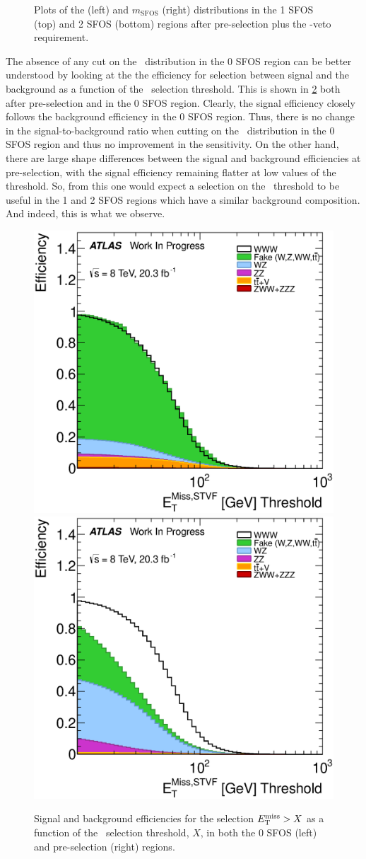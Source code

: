 \begin{figure}[ht!]
\caption{Plots of the \MET (left) and $m_{\textrm{SFOS}}$ (right) distributions 
in the 1 SFOS (top) and 2 SFOS (bottom) regions after pre-selection
plus the \bee-veto requirement.}
\label{fig:met_zwindow_optimization}
\end{figure}

The absence of any cut on the \MET~distribution in the 0 SFOS
region can be better understood by looking at the 
the efficiency for selection between 
signal and the background as a function of the \MET~selection threshold.
This is shown in \fig\ref{fig:met_eff} both after pre-selection
and in the 0 SFOS region.
Clearly, the signal efficiency closely follows the background efficiency
in the 0 SFOS region. Thus, there is no change in the
signal-to-background ratio when cutting on the \MET~distribution
in the 0 SFOS region and thus no improvement in the sensitivity.
On the other hand, there are large shape differences 
between the signal
and background efficiencies at pre-selection, with the 
signal efficiency remaining flatter at low values of the \MET~
threshold. So, from this one would expect a selection
on the \MET~threshold to be useful in the 1 and 2 SFOS
regions which have a similar background composition. And
indeed, this is what we observe.


\begin{figure}[ht!]
\centering
\includegraphics[width=0.45\columnwidth]{figures/optimization/SignalRegionsPreselection_0SFOS_Efficiencies/MET_Et_STVF_Cumulative.eps}
\includegraphics[width=0.45\columnwidth]{figures/optimization/SignalRegions_0p5mmZ0_Preselection_Efficiencies/MET_Et_STVF_Cumulative.eps}
\caption{ Signal and background efficiencies for the 
selection $E_{\mathrm{T}}^{\mathrm{miss}} > X$ as a function of the \MET~selection
threshold, $X$,  in both the 0 SFOS (left) and pre-selection (right) regions.  }
\label{fig:met_eff}
\end{figure}

